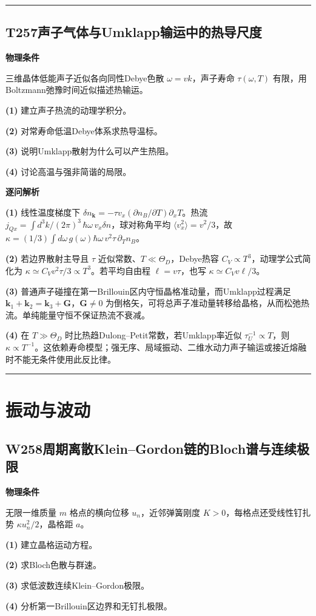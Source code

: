 \documentclass[UTF8,a4paper,11pt,oneside,openany]{ctexbook}
\begin{document}
\par\bigskip\hrule\bigskip
\section*{T257\quad 声子气体与Umklapp输运中的热导尺度}
\textbf{物理条件}\par 三维晶体低能声子近似各向同性Debye色散 \(\omega=vk\)，声子寿命 \(\tau(\omega,T)\) 有限，用Boltzmann弛豫时间近似描述热输运。
\par\noindent\textbf{(1)} 建立声子热流的动理学积分。
\par\noindent\textbf{(2)} 对常寿命低温Debye体系求热导温标。
\par\noindent\textbf{(3)} 说明Umklapp散射为什么可以产生热阻。
\par\noindent\textbf{(4)} 讨论高温与强非简谐的局限。

\par\medskip\noindent\textbf{逐问解析}
\par\noindent\textbf{(1)} 线性温度梯度下 \(\delta n_{\boldsymbol k}=-\tau v_x(\partial n_B/\partial T)\partial_xT\)。热流 \(j_{Qx}=\int d^3k/(2\pi)^3\,\hbar\omega\,v_x\delta n\)，球对称角平均 \(\langle v_x^2\rangle=v^2/3\)，故 \(\kappa=(1/3)\int d\omega\,g(\omega)\hbar\omega\,v^2\tau\,\partial_Tn_B\)。
\par\noindent\textbf{(2)} 若边界散射主导且 \(\tau\) 近似常数、\(T\ll\Theta_D\)，Debye热容 \(C_V\propto T^3\)，动理学公式简化为 \(\kappa\simeq C_Vv^2\tau/3\propto T^3\)。若平均自由程 \(\ell=v\tau\)，也写 \(\kappa\simeq C_Vv\ell/3\)。
\par\noindent\textbf{(3)} 普通声子碰撞在第一Brillouin区内守恒晶格准动量，而Umklapp过程满足 \(\boldsymbol k_1+\boldsymbol k_2=\boldsymbol k_3+\boldsymbol G\)，\(\boldsymbol G\ne0\) 为倒格矢，可将总声子准动量转移给晶格，从而松弛热流。单纯能量守恒不保证热流不衰减。
\par\noindent\textbf{(4)} 在 \(T\gg\Theta_D\) 时比热趋Dulong–Petit常数，若Umklapp率近似 \(\tau_U^{-1}\propto T\)，则 \(\kappa\propto T^{-1}\)。这依赖寿命模型；强无序、局域振动、二维水动力声子输运或接近熔融时不能无条件使用此反比律。

\par\bigskip\hrule\bigskip
\chapter{振动与波动}
\section*{W258\quad 周期离散Klein–Gordon链的Bloch谱与连续极限}
\textbf{物理条件}\par 无限一维质量 \(m\) 格点的横向位移 \(u_n\)，近邻弹簧刚度 \(K>0\)，每格点还受线性钉扎势 \(\kappa u_n^2/2\)，晶格距 \(a\)。
\par\noindent\textbf{(1)} 建立晶格运动方程。
\par\noindent\textbf{(2)} 求Bloch色散与群速。
\par\noindent\textbf{(3)} 求低波数连续Klein–Gordon极限。
\par\noindent\textbf{(4)} 分析第一Brillouin区边界和无钉扎极限。
\end{document}
